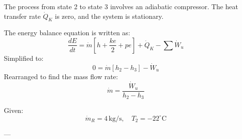 The process from state 2 to state 3 involves an adiabatic compressor. The heat transfer rate \( \dot{Q}_K \) is zero, and the system is stationary.  

The energy balance equation is written as:  
\[
\frac{dE}{dt} = \dot{m} \left[ h + \frac{k e}{2} + p e \right] + \dot{Q}_K - \sum \dot{W}_u
\]  
Simplified to:  
\[
0 = \dot{m} \left[ h_2 - h_3 \right] - \dot{W}_u
\]  
Rearranged to find the mass flow rate:  
\[
\dot{m} = \frac{\dot{W}_u}{h_2 - h_3}
\]  

Given:  
\[
\dot{m}_R = 4 \, \text{kg/s}, \quad T_2 = -22^\circ\text{C}
\]  

---